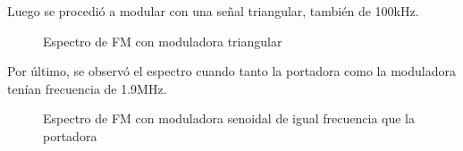 \documentclass[../../labo_tp5_main.tex]{subfiles}
\begin{document}
Luego se procedi\'o a modular con una se\~nal triangular, tambi\'en de 100kHz.

\begin{figure}[H]
	\centering
	\caption{Espectro de FM con moduladora triangular}
\end{figure}

Por \'ultimo, se observ\'o el espectro cuando tanto la portadora como la moduladora ten\'ian frecuencia de 1.9MHz.
\begin{figure}[H]
	\centering
	\caption{Espectro de FM con moduladora senoidal de igual frecuencia que la portadora}
\end{figure}
\end{document}
